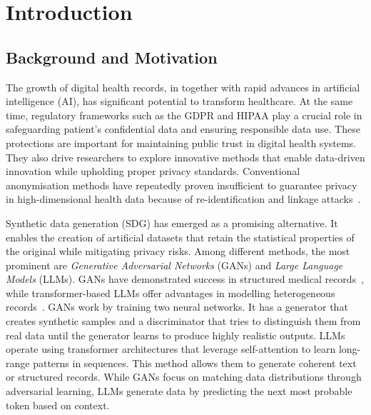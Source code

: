 
\chapter{Introduction}
\label{ch:introduction}

\section{Background and Motivation}
\label{sec:intro:motivation}

The growth of digital health records, in together with rapid advances
in artificial intelligence (AI), has significant potential to transform
healthcare. At the same time, regulatory frameworks such as the
GDPR and HIPAA play a crucial role in safeguarding patient's 
confidential data and ensuring responsible data use. These protections are
important for maintaining public trust in digital health systems. They also
drive researchers to explore innovative methods that enable data-driven
innovation while upholding proper privacy standards. Conventional anonymisation
methods have repeatedly proven insufficient to guarantee privacy in
high-dimensional health data because of re-identification and linkage 
attacks~\cite{Murtaza2023,stadler2022synthetic}.

Synthetic data generation (SDG) has emerged as a promising alternative.
It enables the creation of artificial datasets that retain the statistical
properties of the original while mitigating privacy risks. Among different methods, the most
prominent are \emph{Generative Adversarial Networks} (GANs) and
\emph{Large Language Models} (LLMs). GANs have demonstrated success in
structured medical records~\cite{Choi2017MedGAN,Xu2019CTGAN}, while transformer-based LLMs
offer advantages in modelling heterogeneous
records~\cite{Miletic2024}. GANs work by training
two neural networks. It has a generator that creates synthetic samples and a
discriminator that tries to distinguish them from real data until the
generator learns to produce highly realistic outputs. LLMs
operate using transformer architectures that leverage self-attention to learn
long-range patterns in sequences. This method allows them to generate coherent text or
structured records. While GANs focus on matching data distributions through
adversarial learning, LLMs generate data by predicting the next most probable
token based on context.

